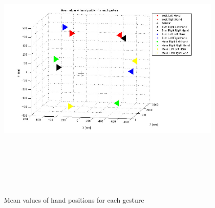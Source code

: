 \begin{figure}
	\hspace{-30 mm}
	\includegraphics[height=135mm]{figures/result/train-all-ges-mean.jpg} \caption{Mean values of hand positions for each gesture} \label{fg:ev:mean} 
\end{figure}
